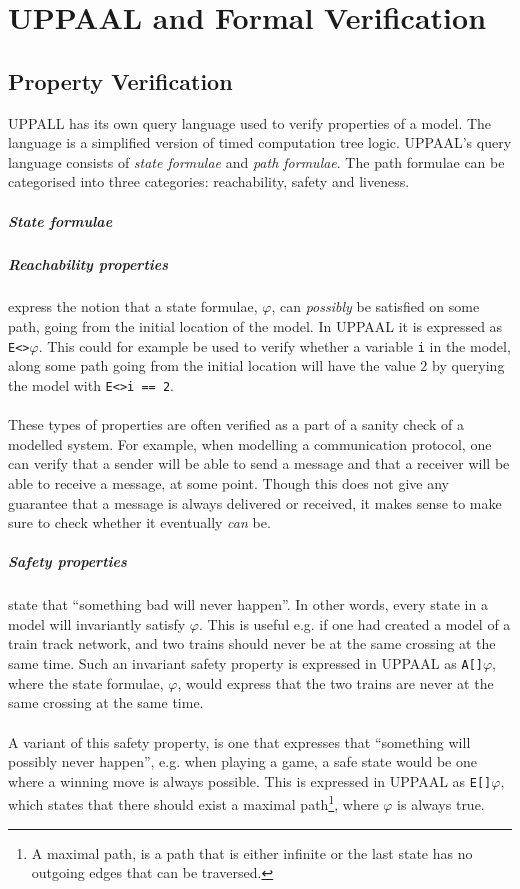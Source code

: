 \chapter{UPPAAL and Formal Verification}
\section{Property Verification}
UPPALL has its own query language used to verify properties of a model\cite[p. 7]{upptut}. The language is a simplified version of timed computation tree logic. UPPAAL's query language consists of \textit{state formulae} and \textit{path formulae}. The path formulae can be categorised into three categories: reachability, safety and liveness.

\paragraph{State formulae}
\paragraph{Reachability properties} express the notion that a state formulae, $\varphi$, can \textit{possibly} be satisfied on some path, going from the initial location of the model. In UPPAAL it is expressed as \texttt{E<>$\varphi$}. This could for example be used to verify whether a variable \texttt{i} in the model, along some path going from the initial location will have the value $2$ by querying the model with \texttt{E<>i == 2}.\\\\
These types of properties are often verified as a part of a sanity check of a modelled system\cite[p. 8]{upptut}. For example, when modelling a communication protocol, one can verify that a sender will be able to send a message and that a receiver will be able to receive a message, at some point. Though this does not give any guarantee that a message is always delivered or received, it makes sense to make sure to check whether it eventually \textit{can} be.
\paragraph{Safety properties} state that ``something bad will never happen''. In other words, every state in a model will invariantly satisfy $\varphi$. This is useful e.g. if one had created a model of a train track network, and two trains should never be at the same crossing at the same time. Such an invariant safety property is expressed in UPPAAL as \texttt{A[]$\varphi$}, where the state formulae, $\varphi$, would express that the two trains are never at the same crossing at the same time.\\\\
A variant of this safety property, is one that expresses that ``something will possibly never happen'', e.g. when playing a game, a safe state would be one where a winning move is always possible. This is expressed in UPPAAL as \texttt{E[]$\varphi$}, which states that there should exist a maximal path\footnote{A maximal path, is a path that is either infinite or the last state has no outgoing edges that can be traversed.}, where $\varphi$ is always true.
